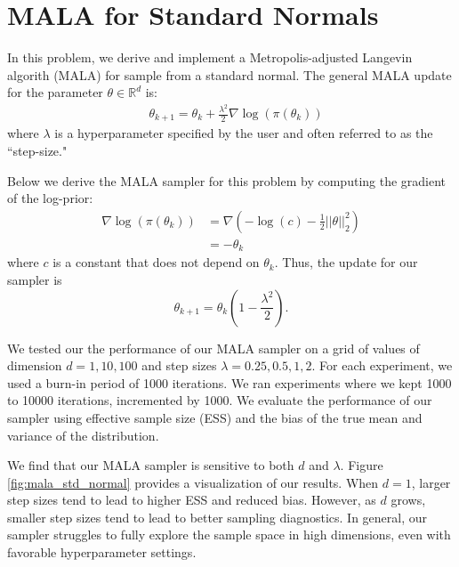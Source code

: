 \documentclass{article}
\begin{document}
\section{MALA for Standard Normals}

In this problem, we derive and implement a Metropolis-adjusted Langevin algorith (MALA) for sample from a standard normal.
The general MALA update for the parameter $\theta \in\mathbb{R}^{d}$ is:
\begin{align}
    & \theta_{k+1} = \theta_{k} + \frac{\lambda^{2}}{2} \nabla \log(\pi(\theta_{k}))
\end{align}
where $\lambda$ is a hyperparameter specified by the user and often referred to as the ``step-size."

Below we derive the MALA sampler for this problem by computing the gradient of the log-prior:
\begin{align}
	\nabla \log(\pi(\theta_{k})) & = \nabla \left(-\log(c) - \frac{1}{2} ||\theta||_2^2 \right) \\
	& = -\theta_{k}
\end{align}
where $c$ is a constant that does not depend on $\theta_{k}$.
Thus, the update for our sampler is $$\theta_{k+1} = \theta_{k} \left(1 - \frac{\lambda^{2}}{2}\right).$$

We tested our the performance of our MALA sampler on a grid of values of dimension $d = 1, 10, 100$ and step sizes $\lambda = 0.25, 0.5, 1, 2$.
For each experiment, we used a burn-in period of 1000 iterations.
We ran experiments where we kept 1000 to 10000 iterations, incremented by 1000.
We evaluate the performance of our sampler using effective sample size (ESS) and the bias of the true mean and variance of the distribution.

We find that our MALA sampler is sensitive to both $d$ and $\lambda$.
Figure \ref{fig:mala_std_normal} provides a visualization of our results.
When $d = 1$, larger step sizes tend to lead to higher ESS and reduced bias.
However, as $d$ grows, smaller step sizes tend to lead to better sampling diagnostics.
In general, our sampler struggles to fully explore the sample space in high dimensions, even with favorable hyperparameter settings.
\end{document}
